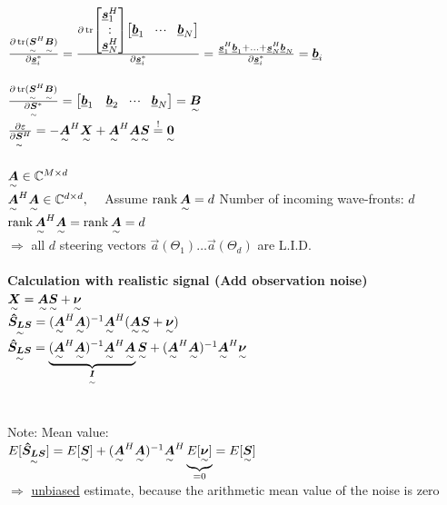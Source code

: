 \begin{doublespace}
$\frac{\partial\trace(\ma{S}^H\ma{B})}{\partial\vec{s}_i^*}=\frac{\partial\trace \mat{\vec{s}_1^H\\\svdots\\\vec{s}_N^H}\mat{\vec{b}_1&\shdots&\vec{b}_N}}{\partial\vec{s}_i^*}=\frac{\vec{s}_1^H\vec{b}_1+\ldots+\vec{s}_N^H\vec{b}_N}{\partial\vec{s}_i^*}=\vec{b}_i$\\ \\
$\frac{\partial\trace(\ma{S}^H\ma{B})}{\partial\ma{S}^*}=\mat{\vec{b}_1&\vec{b}_2&\shdots&\vec{b}_N}=\ma{B}$\\ 
$\frac{\partial\varepsilon}{\partial\ma{S}^H}=-\ma{A}^H\ma{X}+\ma{A}^H\ma{A}\ma{S}\stackrel{!}{=}\ma{0}$\\
\\
$\ma{A}\in\mathbb{C}^{M\times d}$\\
$\ma{A}^H\ma{A}\in\mathbb{C}^{d\times d},\quad$ Assume $\rank \ma{A}=d$ \qquad \pfeil Number of incoming wave-fronts: $d$\\
$\rank\ma{A}^H\ma{A}=\rank\ma{A}=d$\\
$\Rightarrow$ all $d$ steering vectors $\vec{a}(\Theta_1)\ldots\vec{a}(\Theta_d)$ are L.I.D.\\ \ \\
\textbf{Calculation with realistic signal (Add observation noise) }\\
$\ma{X}=\ma{A}\ma{S}+\ma{\nu}$\\
$\ma{\hat{S}_{LS}}=(\ma{A}^H\ma{A})^{-1}\ma{A}^H(\ma{A}\ma{S}+\ma{\nu})$\\
$\ma{\hat{S}_{LS}}=\underbrace{(\ma{A}^H\ma{A})^{-1}\ma{A}^H\ma{A}}_{\ma{I}}\ma{S}+(\ma{A}^H\ma{A})^{-1}\ma{A}^H\ma{\nu}$\\
\\ \ \\
Note: Mean value:\\
$E[\ma{\hat{S}_{LS}}]=E[\ma{S}]+(\ma{A}^H\ma{A})^{-1}\ma{A}^H\underbrace{E[\ma{\nu}]}_{=0}=E[\ma{S}]$\\
$\Rightarrow$ \underline{unbiased} estimate, because the arithmetic mean value of the noise is zero


\end{doublespace}
